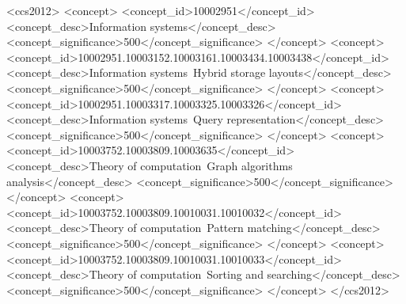 %
%

\begin{CCSXML} <ccs2012> <concept> <concept_id>10002951</concept_id> <concept_desc>Information systems</concept_desc> <concept_significance>500</concept_significance> </concept> <concept> <concept_id>10002951.10003152.10003161.10003434.10003438</concept_id> <concept_desc>Information systems~Hybrid storage layouts</concept_desc> <concept_significance>500</concept_significance> </concept> <concept> <concept_id>10002951.10003317.10003325.10003326</concept_id> <concept_desc>Information systems~Query representation</concept_desc> <concept_significance>500</concept_significance> </concept> <concept> <concept_id>10003752.10003809.10003635</concept_id> <concept_desc>Theory of computation~Graph algorithms analysis</concept_desc> <concept_significance>500</concept_significance> </concept> <concept> <concept_id>10003752.10003809.10010031.10010032</concept_id> <concept_desc>Theory of computation~Pattern matching</concept_desc> <concept_significance>500</concept_significance> </concept> <concept> <concept_id>10003752.10003809.10010031.10010033</concept_id> <concept_desc>Theory of computation~Sorting and searching</concept_desc> <concept_significance>500</concept_significance> </concept> </ccs2012> \end{CCSXML}
     

\printccsdesc
